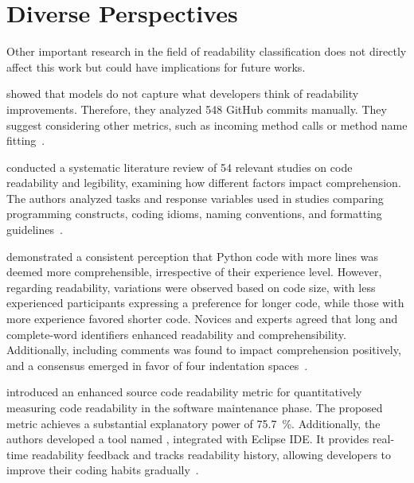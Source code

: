 \documentclass[%
class=scrreprt,
chapterprefix=false,%
open=right,%
twoside=true,%
paper=a4,%
logofile={Logo\_zentral\_farbig\_EN.png},%
thesistype=master,%
UKenglish,%
]{se2thesis}
\theoremstyle{definition}
\begin{document}
	
\section{Diverse Perspectives} \label{Diverse Perspectives}

	Other important research in the field of readability classification does not directly affect this work but could have implications for future works.
	
	\citeauthor{fakhoury2019improving} showed that models do not capture what developers think of readability improvements. Therefore, they analyzed 548 GitHub commits manually. They suggest considering other metrics, such as incoming method calls or method name fitting~\cite{fakhoury2019improving}.	
	
	\citeauthor{oliveira2020evaluating} conducted a systematic literature review of 54 relevant studies on code readability and legibility, examining how different factors impact comprehension. The authors analyzed tasks and response variables used in studies comparing programming constructs, coding idioms, naming conventions, and formatting guidelines~\cite{oliveira2020evaluating}.
	
	\citeauthor{ribeiro2018attributes} demonstrated a consistent perception that Python code with more lines was deemed more comprehensible, irrespective of their experience level. However, regarding readability, variations were observed based on code size, with less experienced participants expressing a preference for longer code, while those with more experience favored shorter code. Novices and experts agreed that long and complete-word identifiers enhanced readability and comprehensibility. Additionally, including comments was found to impact comprehension positively, and a consensus emerged in favor of four indentation spaces~\cite{ribeiro2018attributes}.
	
	\citeauthor{choi2020metric} introduced an enhanced source code readability metric for quantitatively measuring code readability in the software maintenance phase. The proposed metric achieves a substantial explanatory power of 75.7~\%. Additionally, the authors developed a tool named , integrated with Eclipse IDE. It provides real-time readability feedback and tracks readability history, allowing developers to improve their coding habits gradually~\cite{choi2020metric}.
	
\end{document}
